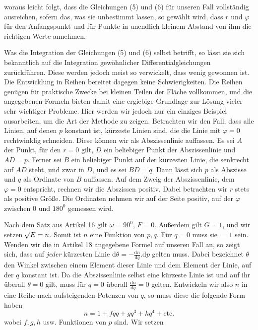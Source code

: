 %
woraus leicht folgt, dass die Gleichungen (5) und (6) für unseren Fall vollständig ausreichen, sofern das, was sie unbestimmt lassen, so gewählt wird, dass \(r\) und \(\varphi\) für den Anfangspunkt und für Punkte in unendlich kleinem Abstand von ihm die richtigen Werte annehmen.

Was die Integration der Gleichungen (5) und (6) selbst betrifft, so lässt sie sich bekanntlich auf die Integration gewöhnlicher Differentialgleichungen zurückführen. Diese werden jedoch meist so verwickelt, dass wenig gewonnen ist. Die Entwicklung in Reihen bereitet dagegen keine Schwierigkeiten. Die Reihen genügen für praktische Zwecke bei kleinen Teilen der Fläche vollkommen, und die angegebenen Formeln bieten damit eine ergiebige Grundlage zur Lösung vieler sehr wichtiger Probleme. Hier werden wir jedoch nur ein einziges Beispiel ausarbeiten, um die Art der Methode zu zeigen.
Betrachten wir den Fall, dass alle Linien, auf denen \(p\) konstant ist, kürzeste Linien sind, die die Linie mit \(\varphi=0\) rechtwinklig schneiden. Diese können wir als Abszissenlinie auffassen. Es sei \(A\) der Punkt, für den \(r=0\) gilt, \(D\) ein beliebiger Punkt der Abszissenlinie und \(AD=p\). Ferner sei \(B\) ein beliebiger Punkt auf der kürzesten Linie, die senkrecht auf \(AD\) steht, und zwar in \(D\), und es sei \(BD=q\). Dann lässt sich \(p\) als Abszisse und \(q\) als Ordinate von \(B\) auffassen. Auf dem Zweig der Abszissenlinie, dem \(\varphi=0\) entspricht, rechnen wir die Abszissen positiv. Dabei betrachten wir \(r\) stets als positive Größe. Die Ordinaten nehmen wir auf der Seite positiv, auf der \(\varphi\) zwischen 0 und \(180^0\) gemessen wird.

Nach dem Satz aus Artikel 16 gilt \(\omega=90^0\), \(F=0\). Außerdem gilt \(G=1\), und wir setzen \(\mathord{{}^{}\!\surd}E=n\). Somit ist \(n\) eine Funktion von \(p,q\). Für \(q=0\) muss sie \(=1\) sein. Wenden wir die in Artikel 18 angegebene Formel auf unseren Fall an, so zeigt sich, dass auf \textit{jeder} kürzesten Linie \(\mathrm{d}\theta=-\frac{\mathrm{d}n}{\mathrm{d}q}\mathord{.}\mathrm{d}p\) gelten muss. Dabei bezeichnet \(\theta\) den Winkel zwischen einem Element dieser Linie und dem Element der Linie, auf der \(q\) konstant ist. Da die Abszissenlinie selbst eine kürzeste Linie ist und auf ihr überall \(\theta=0\) gilt, muss für \(q=0\) überall \(\frac{\mathrm{d}n}{\mathrm{d}q}=0\) gelten. Entwickeln wir also \(n\) in eine Reihe nach aufsteigenden Potenzen von \(q\), so muss diese die folgende Form haben
\[
n=1+fqq+gq^3+hq^4+\text{etc.}
\]
wobei \(f,g,h\) usw. Funktionen von \(p\) sind. Wir setzen

